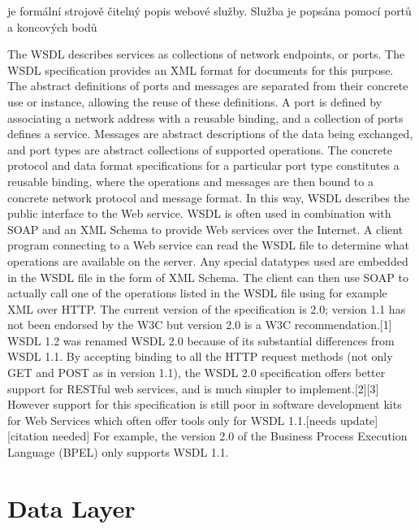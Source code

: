 je formální strojově čitelný popis webové služby. Služba je popsána pomocí portů a koncových bodů


The WSDL describes services as collections of network endpoints, or ports. The WSDL specification provides an XML format for documents for this purpose. The abstract definitions of ports and messages are separated from their concrete use or instance, allowing the reuse of these definitions. A port is defined by associating a network address with a reusable binding, and a collection of ports defines a service. Messages are abstract descriptions of the data being exchanged, and port types are abstract collections of supported operations. The concrete protocol and data format specifications for a particular port type constitutes a reusable binding, where the operations and messages are then bound to a concrete network protocol and message format. In this way, WSDL describes the public interface to the Web service.
WSDL is often used in combination with SOAP and an XML Schema to provide Web services over the Internet. A client program connecting to a Web service can read the WSDL file to determine what operations are available on the server. Any special datatypes used are embedded in the WSDL file in the form of XML Schema. The client can then use SOAP to actually call one of the operations listed in the WSDL file using for example XML over HTTP.
The current version of the specification is 2.0; version 1.1 has not been endorsed by the W3C but version 2.0 is a W3C recommendation.[1] WSDL 1.2 was renamed WSDL 2.0 because of its substantial differences from WSDL 1.1. By accepting binding to all the HTTP request methods (not only GET and POST as in version 1.1), the WSDL 2.0 specification offers better support for RESTful web services, and is much simpler to implement.[2][3] However support for this specification is still poor in software development kits for Web Services which often offer tools only for WSDL 1.1.[needs update][citation needed] For example, the version 2.0 of the Business Process Execution Language (BPEL) only supports WSDL 1.1.




\section{Data Layer}

